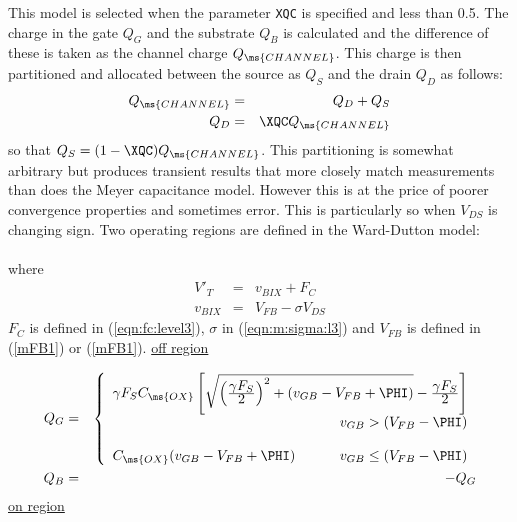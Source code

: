 This model is selected when the parameter {\tt XQC} is specified
and less than 0.5. The charge in the gate $Q_G$ and the substrate
$Q_B$ is calculated and the difference of these is taken as the
channel charge $Q_{\ms{CHANNEL}}$. This charge is then partitioned
and allocated between the source as $Q_S$ and the drain $Q_D$ as
follows:
\begin{eqnarray}
Q_{\ms{CHANNEL}} & = & Q_D + Q_S \\
Q_D         & = & \XQC Q_{\ms{CHANNEL}}\\
\end{eqnarray}
so that $Q_S          =  (1 - \XQC) Q_{\ms{CHANNEL}}$. This
partitioning is somewhat arbitrary but produces transient results
that more closely match measurements than does the Meyer
capacitance model. However this is at the price of poorer
convergence properties and sometimes error. This is particularly
so when $V_{DS}$ is changing sign.
Two operating regions are defined in the Ward-Dutton model:\\[0.1in]
\hspace*{\fill}\\[0.1in]
\noindent where
 \begin{eqnarray}
  V'_T &=& v_{BIX} + F_C\\
  v_{BIX} &=& V_{FB} - \sigma V_{DS}
\end{eqnarray}
$F_C$ is defined in (\ref{eqn:fc:level3}), $\sigma$ in
(\ref{eqn:m:sigma:l3}) and $V_{FB}$ is defined in (\ref{mFB1}) or
(\ref{mFB1}). \underline{off region}

\begin{eqnarray}
       Q_G &=&
      \left\{ \begin{array}{l}
       \gamma F_S C_{\ms{OX}} \left[
         \sqrt{ \left({{\textstyle \gamma F_S}\over{\textstyle 2}}\right)^2
         + (v_{GB}-V_{FB}+\PHI) } -
         {{\textstyle\gamma F_S}\over{\textstyle 2}} \right]\\
      \hspace*{\fill} v_{GB} > (V_{FB}-\PHI)\\
      \\
      C_{\ms{OX}} (v_{GB}-V_{FB}+\PHI)
      \hspace*{\fill} v_{GB} \le (V_{FB}-\PHI)
      \end{array} \right. %
      \\
    Q_B &=& -Q_G
\end{eqnarray}
\underline{on region}

